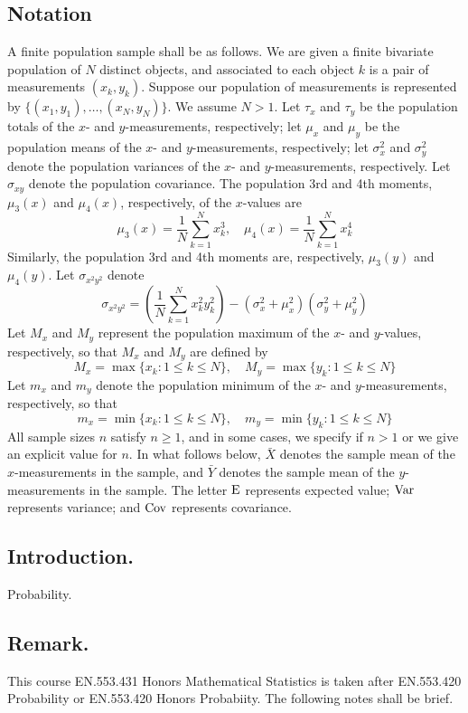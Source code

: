 \documentclass[titlepage]{article}
\begin{document}
\subsection{Notation} A finite population sample shall be as follows. We are given a finite bivariate population of $N$ distinct objects, and associated to each object $k$ is a pair of measurements $(x_k, y_k)$. Suppose our population of measurements is represented by $\{(x_1, y_1), \ldots, (x_N, y_N)\}$. We assume $N > 1$. Let $\tau_x$ and $\tau_y$ be the population totals of the $x$- and $y$-measurements, respectively; let $\mu_x$ and $\mu_y$ be the population means of the $x$- and $y$-measurements, respectively; let $\sigma_x^2$ and $\sigma_y^2$ denote the population variances of the $x$- and $y$-measurements, respectively. Let $\sigma_{xy}$ denote the population covariance.
The population 3rd and 4th moments, $\mu_3(x)$ and $\mu_4(x)$, respectively, of the $x$-values are
$$\mu_3(x) = \frac{1}{N} \sum_{k=1}^{N} x_k^3, \quad \mu_4(x) = \frac{1}{N} \sum_{k=1}^{N} x_k^4$$
Similarly, the population 3rd and 4th moments are, respectively, $\mu_3(y)$ and $\mu_4(y)$.
Let $\sigma_{x^2y^2}$ denote
$$\sigma_{x^2y^2} = \left( \frac{1}{N} \sum_{k=1}^{N} x_k^2 y_k^2 \right) - (\sigma_x^2 + \mu_x^2)(\sigma_y^2 + \mu_y^2)$$
Let $M_x$ and $M_y$ represent the population maximum of the $x$- and $y$-values, respectively, so that $M_x$ and $M_y$ are defined by
$$M_x = \max\{x_k : 1 \leq k \leq N\}, \quad M_y = \max\{y_k : 1 \leq k \leq N\}$$
Let $m_x$ and $m_y$ denote the population minimum of the $x$- and $y$-measurements, respectively, so that
$$m_x = \min\{x_k : 1 \leq k \leq N\}, \quad m_y = \min\{y_k : 1 \leq k \leq N\}$$
All sample sizes $n$ satisfy $n \geq 1$, and in some cases, we specify if $n > 1$ or we give an explicit value for $n$. In what follows below, $\bar{X}$ denotes the sample mean of the $x$-measurements in the sample, and $\bar{Y}$ denotes the sample mean of the $y$-measurements in the sample. The letter $\text{E}$ represents expected value; $\text{Var}$ represents variance; and $\text{Cov}$ represents covariance.

\newpage {}

\subsection{Introduction.} Probability.

\subsection{Remark.} This course EN.553.431 Honors Mathematical Statistics is taken after EN.553.420 Probability or EN.553.420 Honors Probabiity. The following notes shall be brief.
\end{document}
